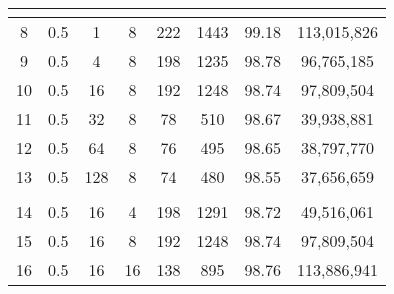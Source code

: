 \begin{table}[H]
\begin{tabular}{|c|c|c|c|c|c|c|c|}
        \hline
        \multicolumn{1}{|l|}{} & \multicolumn{1}{l|}{} & \multicolumn{1}{l|}{} & \multicolumn{1}{l|}{} & \multicolumn{1}{l|}{} & \multicolumn{1}{l|}{} & \multicolumn{1}{l|}{} & \multicolumn{1}{l|}{}    \\
        \hline
        8                      & 0.5                   & 1                     & 8                     & 222                   & 1443                  & 99.18                 & 113,015,826              \\
        9                      & 0.5                   & 4                     & 8                     & 198                   & 1235                  & 98.78                 & 96,765,185               \\
        10                     & 0.5                   & 16                    & 8                     & 192                   & 1248                  & 98.74                 & 97,809,504               \\
        11                     & 0.5                   & 32                    & 8                     & 78                    & 510                   & 98.67                 & 39,938,881               \\
        12                     & 0.5                   & 64                    & 8                     & 76                    & 495                   & 98.65                 & 38,797,770               \\
        13                     & 0.5                   & 128                   & 8                     & 74                    & 480                   & 98.55                 & 37,656,659               \\
        \hline
        \multicolumn{1}{|l|}{} & \multicolumn{1}{l|}{} & \multicolumn{1}{l|}{} & \multicolumn{1}{l|}{} & \multicolumn{1}{l|}{} & \multicolumn{1}{l|}{} & \multicolumn{1}{l|}{} & \multicolumn{1}{l|}{}    \\
        \hline
        14                     & 0.5                   & 16                    & 4                     & 198                   & 1291                  & 98.72                 & 49,516,061               \\
        15                     & 0.5                   & 16                    & 8                     & 192                   & 1248                  & 98.74                 & 97,809,504               \\
        16                     & 0.5                   & 16                    & 16                    & 138                   & 895                   & 98.76                 & 113,886,941              \\

\end{tabular}
\end{table}
